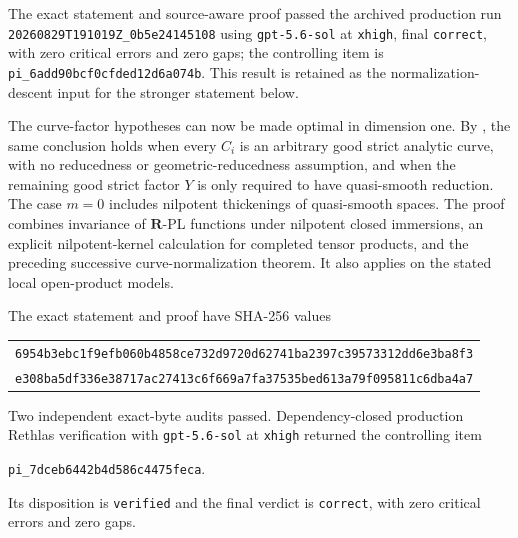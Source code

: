 The exact statement and source-aware proof passed the archived production
run \nolinkurl{20260829T191019Z_0b5e24145108} using
\texttt{gpt-5.6-sol} at \texttt{xhigh}, final \texttt{correct}, with zero
critical errors and zero gaps; the controlling item is
\nolinkurl{pi_6add90bcf0cfded12d6a074b}.  This result is retained as the
normalization-descent input for the stronger statement below.

The curve-factor hypotheses can now be made optimal in dimension one.  By
, the same conclusion holds
when every \(C_i\) is an arbitrary good strict analytic curve, with no
reducedness or geometric-reducedness assumption, and when the remaining
good strict factor \(Y\) is only required to have quasi-smooth reduction.
The case \(m=0\) includes nilpotent thickenings of quasi-smooth spaces.  The
proof combines invariance of \(\mathbf R\)-PL functions under nilpotent
closed immersions, an explicit nilpotent-kernel calculation for completed
tensor products, and the preceding successive curve-normalization theorem.
It also applies on the stated local open-product models.

The exact statement and proof have SHA-256 values
\begin{center}
\small
\begin{tabular}{@{}c@{}}
\nolinkurl{6954b3ebc1f9efb060b4858ce732d9720d62741ba2397c39573312dd6e3ba8f3}\\
\nolinkurl{e308ba5df336e38717ac27413c6f669a7fa37535bed613a79f095811c6dba4a7}
\end{tabular}
\end{center}
Two independent exact-byte audits passed.  Dependency-closed production
Rethlas verification with \texttt{gpt-5.6-sol} at \texttt{xhigh} returned
the controlling item
\begin{center}
\small
\nolinkurl{pi_7dceb6442b4d586c4475feca}.
\end{center}
Its disposition is \texttt{verified} and the final verdict is
\texttt{correct}, with zero critical errors and zero gaps.

